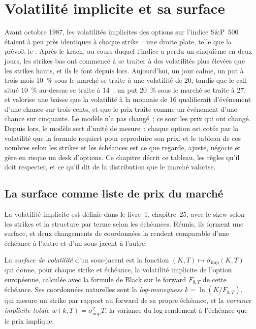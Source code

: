 \chapter{Volatilité implicite et sa surface}\label{ch:dv:implied-volatility-and-its-surface}

Avant octobre 1987, les volatilités implicites des options sur l'indice S\&P~500 étaient
à peu près identiques à chaque strike~: une droite plate, telle que la prévoit le . Après le krach, au cours duquel l'indice a perdu un cinquième en deux
jours, les strikes bas ont commencé à se traiter à des volatilités plus élevées que les
strikes hauts, et ils le font depuis lors. Aujourd'hui, un jour calme, un put à trois mois
10~\% sous le marché se traite à une volatilité de 20, tandis que le call situé 10~\% au-dessus se traite à 14~; un put
20~\% sous le marché se traite à 27, et valorise une baisse que la volatilité à la monnaie de 16
qualifierait d'événement d'une chance sur trois cents, et que le prix traite comme un
événement d'une chance sur cinquante. Le modèle n'a pas changé~; ce sont les prix qui ont changé. Depuis
lors, le modèle sert d'unité de mesure~: chaque option est cotée par la volatilité que la formule
requiert pour reproduire son prix, et le tableau de ces nombres selon les strikes et les
échéances est ce que regarde, ajuste, négocie et gère en risque un desk d'options. Ce chapitre
décrit ce tableau, les règles qu'il doit respecter, et ce qu'il dit de la
distribution que le marché valorise.

\section{La surface comme liste de prix du marché}

La volatilité implicite est définie dans le livre~1, chapitre~25, avec le skew
selon les strikes et la structure par terme selon les échéances. Réunis, ils forment une
surface, et deux changements de coordonnées la rendent comparable d'une échéance à l'autre et
d'un sous-jacent à l'autre.

\begin{definition}\label{def:dv:implied-volatility-and-its-surface:surface}
La \emph{surface de volatilité} d'un sous-jacent est la
fonction $(K,T)\mapsto\sigma_{\mathrm{imp}}(K,T)$ qui donne, pour chaque strike et
échéance, la volatilité implicite de l'option européenne, calculée avec la formule de Black
sur le forward $F_{0,T}$ de cette échéance. Ses coordonnées naturelles sont la
\emph{log-moneyness} $k=\ln(K/F_{0,T})$, qui mesure un strike
par rapport au forward de sa propre échéance, et la \emph{variance implicite
totale} $w(k,T)=\sigma_{\mathrm{imp}}^2T$, la variance
du log-rendement à l'échéance que le prix implique.
\end{definition}


